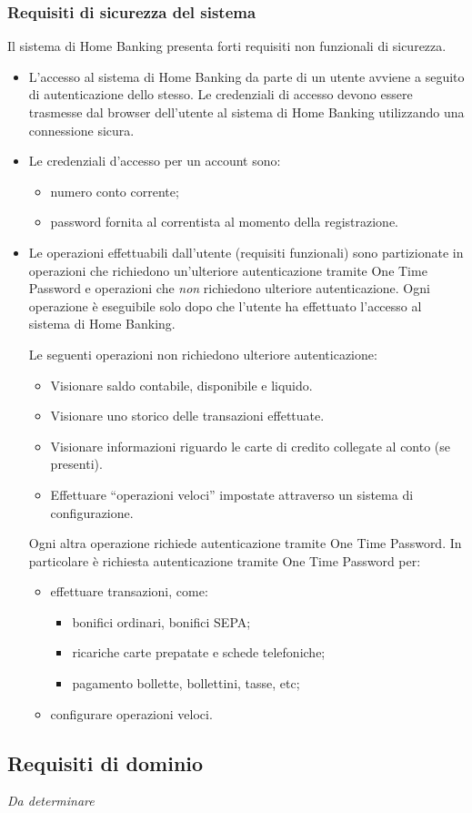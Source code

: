 \subsubsection{Requisiti di sicurezza del sistema}

Il sistema di Home Banking presenta forti requisiti non funzionali di sicurezza.

\begin{itemize}
	\item L'accesso al sistema di Home Banking da parte di un utente avviene a seguito di autenticazione dello stesso.
		Le credenziali di accesso devono essere trasmesse dal browser dell'utente al sistema di Home Banking utilizzando una connessione sicura.
	\item Le credenziali d'accesso per un account sono:
		\begin{itemize}
			\item numero conto corrente;
			\item password fornita al correntista al momento della registrazione.
		\end{itemize}
	\item Le operazioni effettuabili dall'utente (requisiti funzionali) sono partizionate in operazioni che richiedono un'ulteriore autenticazione tramite One Time Password e operazioni che \emph{non} richiedono ulteriore autenticazione.
	Ogni operazione \`e eseguibile solo dopo che l'utente ha effettuato l'accesso al sistema di Home Banking.

	Le seguenti operazioni non richiedono ulteriore autenticazione:
	\begin{itemize}
		\item Visionare saldo contabile, disponibile e liquido.
		\item Visionare uno storico delle transazioni effettuate.
		\item Visionare informazioni riguardo le carte di credito collegate al conto (se presenti).
		\item Effettuare ``operazioni veloci'' impostate attraverso un sistema di configurazione.
	\end{itemize}
	
	Ogni altra operazione richiede autenticazione tramite One Time Password.
	In particolare \`e richiesta autenticazione tramite One Time Password per:
	\begin{itemize}
		\item effettuare transazioni, come:
		\begin{itemize}
			\item bonifici ordinari, bonifici SEPA;
			\item ricariche carte prepatate e schede telefoniche;
			\item pagamento bollette, bollettini, tasse, etc;
		\end{itemize}
		\item configurare operazioni veloci.
	\end{itemize}
\end{itemize}

\subsection{Requisiti di dominio}

\emph{Da determinare}

